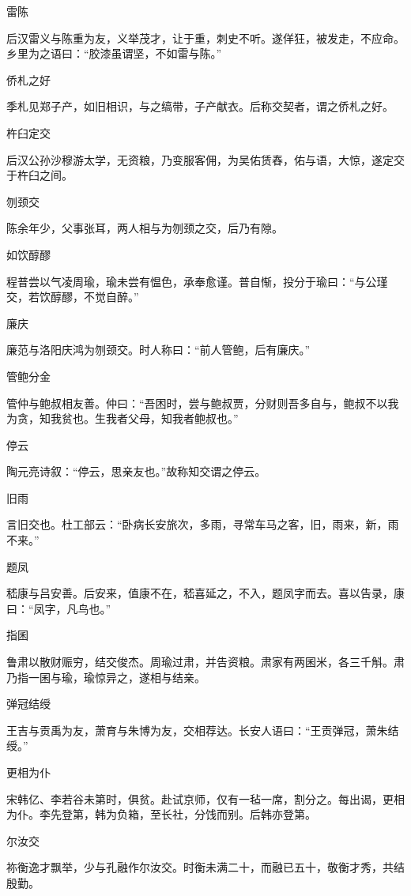 \documentclass[a4paper,12pt,UTF8,twoside]{ctexbook}
\begin{document}
    雷陈
    
    后汉雷义与陈重为友，义举茂才，让于重，刺史不听。遂佯狂，被发走，不应命。乡里为之语曰：“胶漆虽谓坚，不如雷与陈。”
    
    侨札之好
    
    季札见郑子产，如旧相识，与之缟带，子产献衣。后称交契者，谓之侨札之好。
    
    杵臼定交
    
    后汉公孙沙穆游太学，无资粮，乃变服客佣，为吴佑赁舂，佑与语，大惊，遂定交于杵臼之间。
    
    刎颈交
    
    陈余年少，父事张耳，两人相与为刎颈之交，后乃有隙。
    
    如饮醇醪
    
    程普尝以气凌周瑜，瑜未尝有愠色，承奉愈谨。普自惭，投分于瑜曰：“与公瑾交，若饮醇醪，不觉自醉。”
    
    廉庆
    
    廉范与洛阳庆鸿为刎颈交。时人称曰：“前人管鲍，后有廉庆。”
    
    管鲍分金
    
    管仲与鲍叔相友善。仲曰：“吾困时，尝与鲍叔贾，分财则吾多自与，鲍叔不以我为贪，知我贫也。生我者父母，知我者鲍叔也。”
    
    停云
    
    陶元亮诗叙：“停云，思亲友也。”故称知交谓之停云。
    
    旧雨
    
    言旧交也。杜工部云：“卧病长安旅次，多雨，寻常车马之客，旧，雨来，新，雨不来。”
    
    题凤
    
    嵇康与吕安善。后安来，值康不在，嵇喜延之，不入，题凤字而去。喜以告录，康曰：“凤字，凡鸟也。”
    
    指囷
    
    鲁肃以散财赈穷，结交俊杰。周瑜过肃，并告资粮。肃家有两囷米，各三千斛。肃乃指一囷与瑜，瑜惊异之，遂相与结亲。
    
    弹冠结绶
    
    王吉与贡禹为友，萧育与朱博为友，交相荐达。长安人语曰：“王贡弹冠，萧朱结绶。”
    
    更相为仆
    
    宋韩亿、李若谷未第时，俱贫。赴试京师，仅有一毡一席，割分之。每出谒，更相为仆。李先登第，韩为负箱，至长社，分饯而别。后韩亦登第。
    
    尔汝交
    
    祢衡逸才飘举，少与孔融作尔汝交。时衡未满二十，而融已五十，敬衡才秀，共结殷勤。
    
\end{document}
